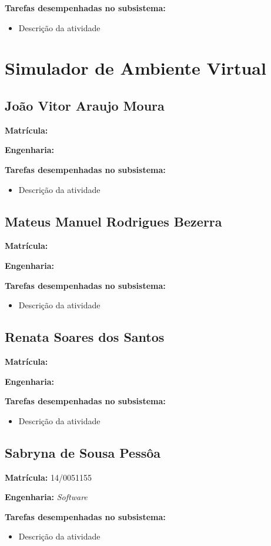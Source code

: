 \textbf{Tarefas desempenhadas no subsistema:}

\begin{itemize}
\item Descrição da atividade
\end{itemize}

\section{Simulador de Ambiente Virtual}

\subsection{João Vitor Araujo Moura}

\textbf{Matrícula:}

\textbf{Engenharia:}

\textbf{Tarefas desempenhadas no subsistema:}

\begin{itemize}
\item Descrição da atividade
\end{itemize}


\subsection{Mateus Manuel Rodrigues Bezerra}

\textbf{Matrícula:}

\textbf{Engenharia:}

\textbf{Tarefas desempenhadas no subsistema:}

\begin{itemize}
\item Descrição da atividade
\end{itemize}


\subsection{Renata Soares dos Santos}

\textbf{Matrícula:}

\textbf{Engenharia:}

\textbf{Tarefas desempenhadas no subsistema:}

\begin{itemize}
\item Descrição da atividade
\end{itemize}


\subsection{Sabryna de Sousa Pessôa}

\textbf{Matrícula:} 14/0051155

\textbf{Engenharia:} \textit{Software}

\textbf{Tarefas desempenhadas no subsistema:}

\begin{itemize}
\item Descrição da atividade
\end{itemize}

